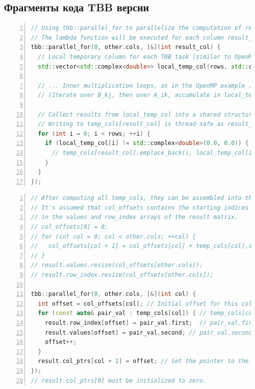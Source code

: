 \documentclass[12pt]{article}
\begin{document}
\subsection*{Фрагменты кода TBB версии}
\begin{lstlisting}[language=C++, numbers=left, caption=Распараллеливание вычисления столбцов с помощью TBB, label=lst:tbb_compute_example]
// Using tbb::parallel_for to parallelize the computation of result matrix columns.
// The lambda function will be executed for each column result_col.
tbb::parallel_for(0, other.cols, [&](int result_col) {
  // Local temporary column for each TBB task (similar to OpenMP).
  std::vector<std::complex<double>> local_temp_col(rows, std::complex<double>(0.0, 0.0));

  // ... Inner multiplication loops, as in the OpenMP example ...
  // (Iterate over B_kj, then over A_ik, accumulate in local_temp_col[i])

  // Collect results from local_temp_col into a shared structure (e.g., temp_cols[result_col]).
  // Writing to temp_cols[result_col] is thread-safe as result_col is unique.
  for (int i = 0; i < rows; ++i) {
    if (local_temp_col[i] != std::complex<double>(0.0, 0.0)) {
      // temp_cols[result_col].emplace_back(i, local_temp_col[i]); // Example
    }
  }
});
\end{lstlisting}

\begin{lstlisting}[language=C++, numbers=left, caption=Параллельная сборка матрицы из временных колонок с помощью TBB, label=lst:tbb_assemble_example]
// After computing all temp_cols, they can be assembled into the final matrix in parallel.
// It's assumed that col_offsets contains the starting indices for each column
// in the values and row_index arrays of the result matrix.
// col_offsets[0] = 0;
// for (int col = 0; col < other.cols; ++col) {
//   col_offsets[col + 1] = col_offsets[col] + temp_cols[col].size();
// }
// result.values.resize(col_offsets[other.cols]);
// result.row_index.resize(col_offsets[other.cols]);

tbb::parallel_for(0, other.cols, [&](int col) {
  int offset = col_offsets[col]; // Initial offset for this column
  for (const auto& pair_val : temp_cols[col]) { // temp_cols[col] is a vector of pairs {row, value}
    result.row_index[offset] = pair_val.first;  // pair_val.first is row i
    result.values[offset] = pair_val.second; // pair_val.second is value C_ij
    offset++;
  }
  result.col_ptrs[col + 1] = offset; // Set the pointer to the start of the next column
});
// result.col_ptrs[0] must be initialized to zero.
\end{lstlisting}
\end{document}
